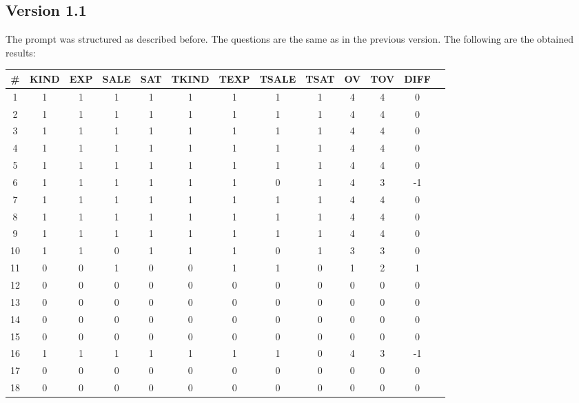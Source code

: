 \subsection{Version 1.1}
The prompt was structured as described before. The questions are the same as in the previous version. The following are the obtained results:
\begin{center}
      \begin{tabular}{ccccccccccccc}
            \toprule
            \# & KIND & EXP & SALE & SAT & TKIND & TEXP & TSALE & TSAT & OV & TOV & DIFF \\

            \midrule
            1  & 1    & 1   & 1    & 1   & 1     & 1    & 1     & 1    & 4  & 4   & 0    \\
            2  & 1    & 1   & 1    & 1   & 1     & 1    & 1     & 1    & 4  & 4   & 0    \\
            3  & 1    & 1   & 1    & 1   & 1     & 1    & 1     & 1    & 4  & 4   & 0    \\
            4  & 1    & 1   & 1    & 1   & 1     & 1    & 1     & 1    & 4  & 4   & 0    \\
            5  & 1    & 1   & 1    & 1   & 1     & 1    & 1     & 1    & 4  & 4   & 0    \\
            6  & 1    & 1   & 1    & 1   & 1     & 1    & 0     & 1    & 4  & 3   & -1   \\
            7  & 1    & 1   & 1    & 1   & 1     & 1    & 1     & 1    & 4  & 4   & 0    \\
            8  & 1    & 1   & 1    & 1   & 1     & 1    & 1     & 1    & 4  & 4   & 0    \\
            9  & 1    & 1   & 1    & 1   & 1     & 1    & 1     & 1    & 4  & 4   & 0    \\
            10 & 1    & 1   & 0    & 1   & 1     & 1    & 0     & 1    & 3  & 3   & 0    \\
            11 & 0    & 0   & 1    & 0   & 0     & 1    & 1     & 0    & 1  & 2   & 1    \\
            12 & 0    & 0   & 0    & 0   & 0     & 0    & 0     & 0    & 0  & 0   & 0    \\
            13 & 0    & 0   & 0    & 0   & 0     & 0    & 0     & 0    & 0  & 0   & 0    \\
            14 & 0    & 0   & 0    & 0   & 0     & 0    & 0     & 0    & 0  & 0   & 0    \\
            15 & 0    & 0   & 0    & 0   & 0     & 0    & 0     & 0    & 0  & 0   & 0    \\
            16 & 1    & 1   & 1    & 1   & 1     & 1    & 1     & 0    & 4  & 3   & -1   \\
            17 & 0    & 0   & 0    & 0   & 0     & 0    & 0     & 0    & 0  & 0   & 0    \\
            18 & 0    & 0   & 0    & 0   & 0     & 0    & 0     & 0    & 0  & 0   & 0    \\
            \bottomrule
      \end{tabular}
\end{center}

